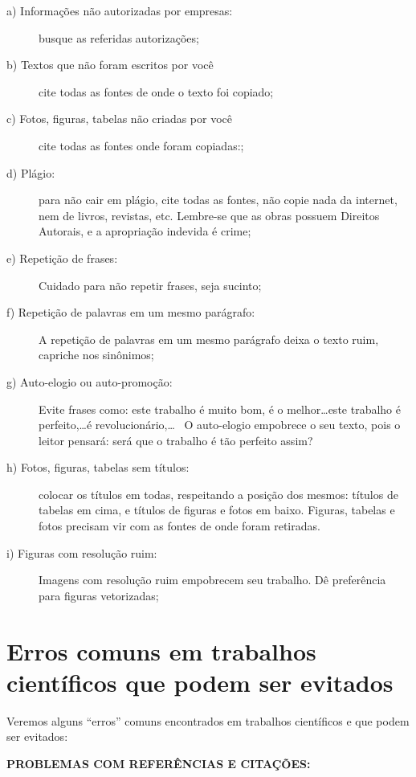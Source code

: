 \begin{description}
    \item [a) Informações não autorizadas por empresas:] busque as referidas autorizações;
    \item [b) Textos que não foram escritos por você] cite todas as fontes de onde o texto foi copiado;
    \item [c) Fotos, figuras, tabelas não criadas por você] cite todas as fontes onde foram copiadas:;
    \item [d) Plágio:] para não cair em plágio, cite todas as fontes, não copie nada da internet, nem de livros, revistas, etc. Lembre-se que as obras possuem Direitos Autorais, e a apropriação indevida é crime;
    \item [e) Repetição de frases:] Cuidado para não repetir frases, seja sucinto;
    \item [f) Repetição de palavras em um mesmo parágrafo:] A repetição de palavras em um mesmo parágrafo deixa o texto ruim, capriche nos sinônimos;
    \item [g) Auto-elogio ou auto-promoção:] Evite frases como: este trabalho é muito bom, é o melhor\ldots este trabalho é perfeito,\ldots é revolucionário,\ldots~ O auto-elogio empobrece o seu texto, pois o leitor pensará: será que o trabalho é tão perfeito assim?
    \item [h) Fotos, figuras, tabelas sem títulos:] colocar os títulos em todas, respeitando a posição dos mesmos: títulos de tabelas em cima, e títulos de figuras e fotos em baixo. Figuras, tabelas e fotos precisam vir com as fontes de onde foram retiradas. 
    \item [i) Figuras com resolução ruim:] Imagens com resolução ruim empobrecem seu trabalho. Dê preferência para figuras vetorizadas;     
\end{description}
    

\section{Erros comuns em trabalhos científicos que podem ser evitados}

Veremos alguns ``erros'' comuns encontrados em trabalhos científicos e que podem ser evitados:

{\bf PROBLEMAS COM REFERÊNCIAS E
CITAÇÕES:}


